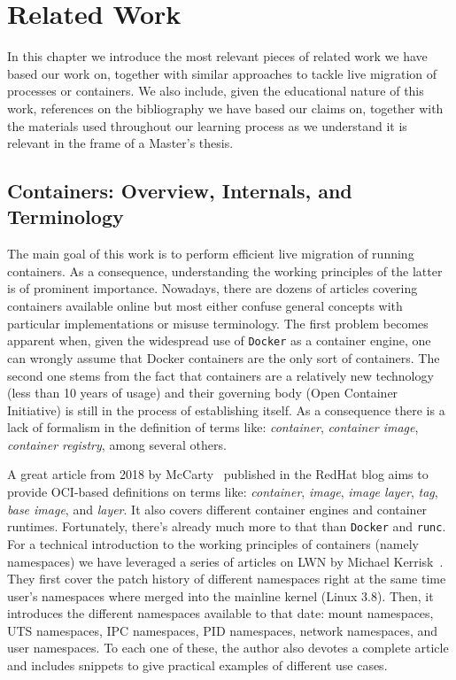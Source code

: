 \chapter{Related Work} \label{chap:related-work}

In this chapter we introduce the most relevant pieces of related work we have based our work on, together with similar approaches to tackle live migration of processes or containers.
We also include, given the educational nature of this work, references on the bibliography we have based our claims on, together with the materials used throughout our learning process as we understand it is relevant in the frame of a Master's thesis.

\section{Containers: Overview, Internals, and Terminology}

The main goal of this work is to perform efficient live migration of running containers.
As a consequence, understanding the working principles of the latter is of prominent importance.
Nowadays, there are dozens of articles covering containers available online but most either confuse general concepts with particular implementations or misuse terminology.
The first problem becomes apparent when, given the widespread use of \texttt{Docker} as a container engine, one can wrongly assume that Docker containers are the only sort of containers.
The second one stems from the fact that containers are a relatively new technology (less than 10 years of usage) and their governing body (Open Container Initiative) is still in the process of establishing itself.
As a consequence there is a lack of formalism in the definition of terms like: \textit{container}, \textit{container image}, \textit{container registry}, among several others.

A great article from 2018 by McCarty~\cite{McCarty2018} published in the RedHat blog aims to provide OCI-based definitions on terms like: \textit{container}, \textit{image}, \textit{image layer}, \textit{tag}, \textit{base image}, and \textit{layer}.
It also covers different container engines and container runtimes.
Fortunately, there's already much more to that than \texttt{Docker} and \texttt{runc}.
For a technical introduction to the working principles of containers (namely namespaces) we have leveraged a series of articles on LWN by Michael Kerrisk~\cite{Kerrisk2013}.
They first cover the patch history of different namespaces right at the same time user's namespaces where merged into the mainline kernel (Linux 3.8).
Then, it introduces the different namespaces available to that date: mount namespaces, UTS namespaces, IPC namespaces, PID namespaces, network namespaces, and user namespaces.
To each one of these, the author also devotes a complete article and includes snippets to give practical examples of different use cases.

